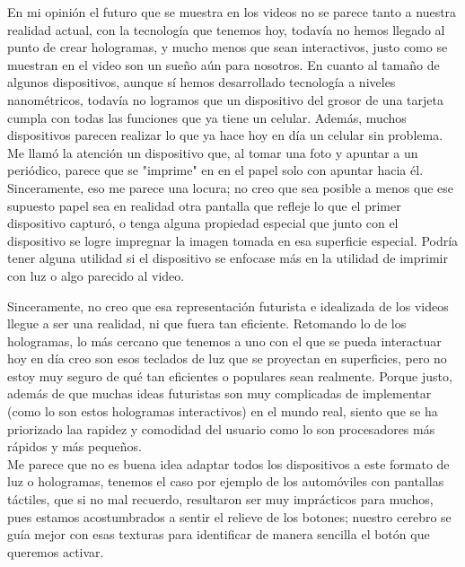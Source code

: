 \documentclass[12pt,letterpaper]{article}
\begin{document}


\newpage

En mi opinión el futuro que se muestra en los videos no se parece tanto a nuestra realidad actual, con la
tecnología que tenemos hoy, todavía no hemos llegado al punto de crear hologramas, y mucho menos que sean
interactivos, justo como se muestran en el video son un sueño aún para nosotros. En cuanto al tamaño de algunos
dispositivos, aunque sí hemos desarrollado tecnología a niveles nanométricos, todavía no logramos que un
dispositivo del grosor de una tarjeta cumpla con todas las funciones que ya tiene un celular. Además, muchos
dispositivos parecen realizar lo que ya hace hoy en día un celular sin problema.\\

\noindent
Me llamó la atención un  dispositivo que, al tomar una foto y apuntar a un periódico, parece que se "imprime" en
en el papel solo con apuntar hacia él. Sinceramente, eso me parece una locura; no creo que sea posible a menos
que ese supuesto papel sea en realidad otra pantalla que refleje lo que el primer dispositivo capturó, o tenga
alguna propiedad especial que junto con el dispositivo se logre impregnar la imagen tomada en esa superficie
especial. Podría tener alguna utilidad si el dispositivo se enfocase más en la utilidad de imprimir con luz o algo
parecido al video.

\noindent
Sinceramente, no creo que esa representación futurista e idealizada de los videos llegue a ser una realidad, ni
que fuera tan eficiente. Retomando lo de los hologramas, lo más cercano que tenemos a uno con el que se pueda
interactuar hoy en día creo son esos teclados de luz que se proyectan en superficies, pero no estoy muy seguro de
qué tan eficientes o populares sean realmente. Porque justo, además de que muchas ideas futuristas son muy
complicadas de implementar (como lo son estos hologramas interactivos) en el mundo real, siento que se ha
priorizado laa rapidez y comodidad del usuario como lo son procesadores más rápidos y más pequeños.\\

Me parece que no es buena idea adaptar todos los dispositivos a este formato de luz o hologramas, tenemos el caso
por ejemplo de los automóviles con pantallas táctiles, que si no mal recuerdo, resultaron ser muy imprácticos
para muchos, pues estamos acostumbrados a sentir el relieve de los botones; nuestro cerebro se guía mejor con
esas
texturas para identificar de manera sencilla el botón que queremos activar.
\end{document}
